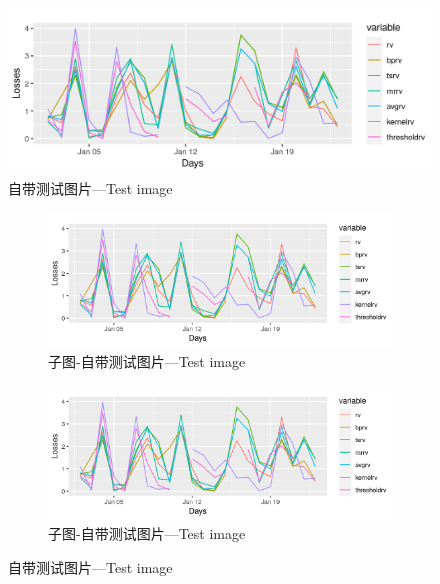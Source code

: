 \begin{figure}[htb]
    \centering
    \includegraphics[width=.5\textwidth]{example-image-a}
    \caption{自带测试图片---Test image}\label{F:test-a}
\end{figure}

\begin{figure}[htb]
    \centering
    \begin{subfigure}[t]{.45\linewidth}
        \centering
        \includegraphics[width=1\textwidth]{example-image-a}
        \caption{子图-自带测试图片---Test image}\label{F:test-b-sub-a}
    \end{subfigure}
    \begin{subfigure}[t]{.45\linewidth}
        \centering
        \includegraphics[width=1\textwidth]{example-image-a}
        \caption{子图-自带测试图片---Test image}\label{F:test-b-sub-b}
    \end{subfigure}
    \caption{自带测试图片---Test image}\label{F:test-b}
\end{figure}